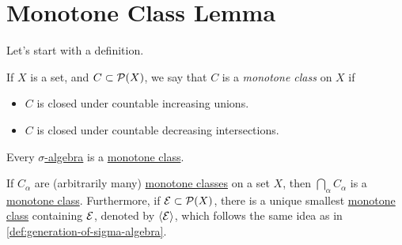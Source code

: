 \section{Monotone Class Lemma}
Let's start with a definition.
\begin{definition}\label{def:monotone-class}
	If \(X\) is a set, and \(C\subset \mathcal{\MakeUppercase{p}} (X)\), we say that \(C\) is a \emph{monotone class} on \(X\) if
	\begin{itemize}
		\item \(C\) is closed under countable increasing unions.
		\item \(C\) is closed under countable decreasing intersections.
	\end{itemize}
\end{definition}

\begin{eg}
	Every \hyperref[def:sigma-algebra]{\(\sigma\)-algebra} is a \hyperref[def:monotone-class]{monotone class}.
\end{eg}

\begin{eg}
	If \(C_\alpha \) are (arbitrarily many) \hyperref[def:monotone-class]{monotone classes} on a set \(X\), then \(\bigcap\limits_{\alpha}C_\alpha  \)
	is a \hyperref[def:monotone-class]{monotone class}. Furthermore, if \(\mathcal{\MakeUppercase{e}} \subset \mathcal{\MakeUppercase{p}} (X)\), there is a unique smallest
	\hyperref[def:monotone-class]{monotone class} containing \(\mathcal{\MakeUppercase{e}}\), denoted by \(\left< \mathcal{\MakeUppercase{e}}  \right> \), which follows the same
	idea as in \autoref{def:generation-of-sigma-algebra}.
\end{eg}

